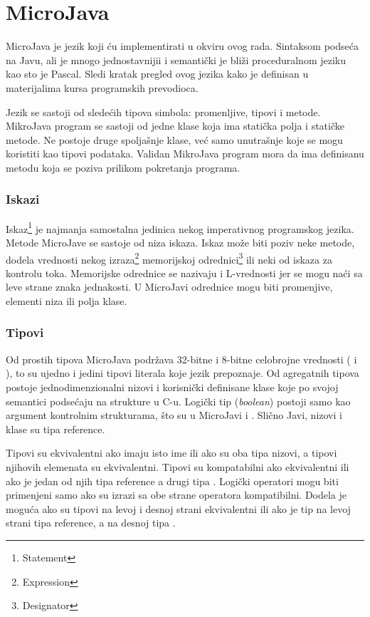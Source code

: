 
\chapter{MicroJava}

MicroJava je jezik koji ću implementirati u okviru ovog rada. Sintaksom podseća na Javu, ali je mnogo jednostavnijii i semantički je bliži proceduralnom jeziku kao sto je Pascal. Sledi kratak pregled ovog jezika kako je definisan u materijalima kursa programskih prevodioca.

Jezik se sastoji od sledećih tipova simbola: promenljive, tipovi i metode. MikroJava program se sastoji od jedne klase koja ima statička polja i statičke metode. Ne postoje druge spoljašnje klase, već samo unutrašnje koje se mogu koristiti kao tipovi podataka. Validan  MikroJava program mora da ima definisanu metodu  koja se poziva prilikom pokretanja programa.

\subsection*{Iskazi}

Iskaz\footnote{\eng Statement} je najmanja samostalna jedinica nekog imperativnog programskog jezika. Metode MicroJave se sastoje od niza iskaza. Iskaz može biti poziv neke metode, dodela vrednosti nekog izraza\footnote{\eng Expression} memorijskoj odrednici\footnote{\eng Designator} ili neki od iskaza za kontrolu toka. Memorijske odrednice se nazivaju i L-vrednosti jer se mogu naći sa leve strane znaka jednakosti. U MicroJavi odrednice mogu biti promenjive, elementi niza ili polja klase.

\subsection*{Tipovi}

Od prostih tipova MicroJava podržava 32-bitne i 8-bitne celobrojne vrednosti ( i ), to su ujedno i jedini tipovi literala koje jezik prepoznaje. Od agregatnih tipova postoje jednodimenzionalni nizovi i korisnički definisane  klase koje po svojoj semantici podsećaju na strukture u C-u. Logički tip (\textit{boolean}) postoji samo kao argument kontrolnim strukturama, što su u MicroJavi  i . Slično Javi, nizovi i klase su tipa reference.

Tipovi su ekvivalentni ako imaju isto ime ili ako su oba tipa nizovi, a tipovi njihovih elemenata su ekvivalentni. Tipovi su kompatabilni ako ekvivalentni ili ako je jedan od njih tipa reference a drugi tipa . Logički operatori mogu biti primenjeni samo ako su izrazi sa obe strane operatora kompatibilni. Dodela je moguća ako su tipovi na levoj i desnoj strani ekvivalentni ili ako je tip na levoj strani tipa reference, a na desnoj tipa .

